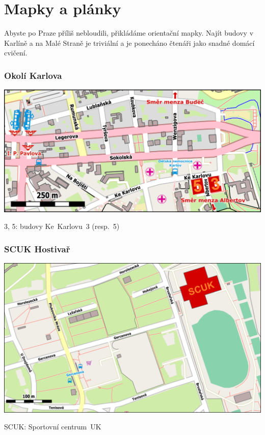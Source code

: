 \section{Mapky a plánky}
Abyste po Praze příliš nebloudili, přikládáme orientační mapky. Najít budovy v
Karlíně a na Malé Straně je triviální a je ponecháno čtenáři jako snadné domácí
cvičení.

\subsubsection*{Okolí Karlova}
\begin{center}\includegraphics[width=\textwidth]{Images/mapaKarlov.png}\end{center}
 3, 5: budovy Ke~Karlovu~3 (resp.~5)

\subsubsection*{SCUK Hostivař}
\begin{center}\includegraphics[width=\textwidth]{Images/mapaHostivar.png}\end{center}
 SCUK: Sportovní centrum~UK